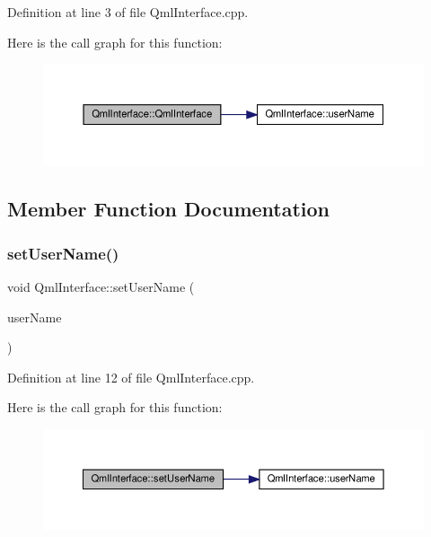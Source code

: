 Definition at line 3 of file Qml\+Interface.\+cpp.

Here is the call graph for this function\+:
\nopagebreak
\begin{figure}[H]
\begin{center}
\leavevmode
\includegraphics[width=350pt]{class_qml_interface_a4fcfe1f5b0ffd211526da9479836f4bb_cgraph}
\end{center}
\end{figure}


\subsection{Member Function Documentation}
\mbox{\label{class_qml_interface_a29e94fd20544d125c169c3e023e45c97}} 
\subsubsection{\texorpdfstring{set\+User\+Name()}{setUserName()}}
{\footnotesize\ttfamily void Qml\+Interface\+::set\+User\+Name (\begin{DoxyParamCaption}\item[{const Q\+String \&}]{user\+Name }\end{DoxyParamCaption})}



Definition at line 12 of file Qml\+Interface.\+cpp.

Here is the call graph for this function\+:
\nopagebreak
\begin{figure}[H]
\begin{center}
\leavevmode
\includegraphics[width=350pt]{class_qml_interface_a29e94fd20544d125c169c3e023e45c97_cgraph}
\end{center}
\end{figure}
\mbox{\label{class_qml_interface_aec25299986ea1222d2bf1c358c92defc}} 
